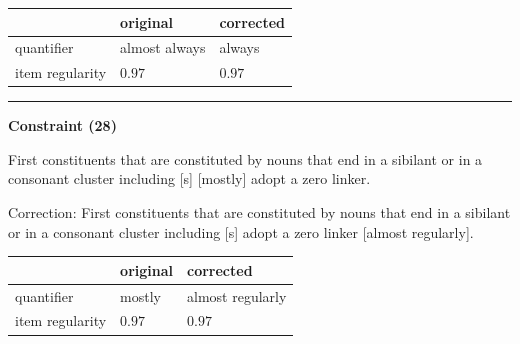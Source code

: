 \vspace{-0.25em}

\begin{table}[!ht]

\begin{center}
\setlength{\extrarowheight}{1pt}
\begin{tabularx}{\columnwidth}{|X|X|X|}
      \hline
                        & original      & corrected \\
      \hline
      quantifier        & almost always      & always   \\
      \hline
      item regularity   & $0.97$      & $0.97$   \\
      \hline
\end{tabularx}
\end{center}
\end{table}

\vspace{-0.75em}
\hrule




\vspace{0.6em}

\begin{center}
\textbf{Constraint (28)}
\end{center}

\noindent
First constituents that are constituted by nouns that end in a sibilant or in a consonant cluster including [s] [mostly] adopt a zero linker.
\vspace{0.3em}

\noindent
Correction: First constituents that are constituted by nouns that end in a sibilant or in a consonant cluster including [s] adopt a zero linker [almost regularly].

\vspace{-0.25em}

\begin{table}[!ht]

\begin{center}
\setlength{\extrarowheight}{1pt}
\begin{tabularx}{\columnwidth}{|X|X|X|}
      \hline
                        & original      & corrected \\
      \hline
      quantifier        & mostly      & almost regularly   \\
      \hline
      item regularity   & $0.97$      & $0.97$   \\
      \hline
\end{tabularx}
\end{center}
\end{table}

